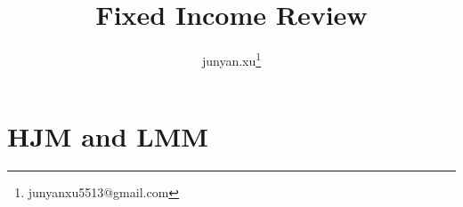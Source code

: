 \documentclass[11pt, oneside]{article}   	%
\title{Fixed Income Review}
\author{junyan.xu\footnote{junyanxu5513@gmail.com}}
\begin{document}
\maketitle
\tableofcontents
\newpage

\section{HJM and LMM}
\end{document}
